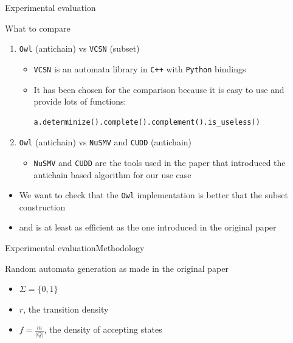 \documentclass[10pt]{beamer}
\begin{document}
\begin{frame}[fragile]{Experimental evaluation}

\begin{block}{What to compare}
  \begin{enumerate}
    \item \texttt{Owl} (antichain) vs \texttt{VCSN} (subset)
    \begin{itemize}
      \item \texttt{VCSN} is an automata library in \texttt{C++} with \texttt{Python} bindings
      \item It has been chosen for the comparison because it is easy to use and provide lots of
      functions:
      \begin{lstlisting}
a.determinize().complete().complement().is_useless()
      \end{lstlisting}
    \end{itemize}
    \item \texttt{Owl} (antichain) vs \texttt{NuSMV} and \texttt{CUDD} (antichain)
    \begin{itemize}
      \item \texttt{NuSMV} and \texttt{CUDD} are the tools used in the paper  \cite{antichain-universality} that introduced the antichain based algorithm for our use case
    \end{itemize}
  \end{enumerate}
  \begin{itemize}
    \item We want to check that the \texttt{Owl} implementation is better that the subset construction
    \item and is at least as efficient as the one introduced in the original paper
  \end{itemize}
\end{block}
\end{frame}

\begin{frame}{Experimental evaluation}{Methodology}
  \begin{block}{Random automata generation as made in the original paper}
  \begin{itemize}
    \item $\Sigma = \{0, 1\}$
    \item $r$, the transition density
    \item $f = \frac{m}{|Q|}$, the density of accepting states
  \end{itemize}
\end{block}
\end{frame}
\end{document}
